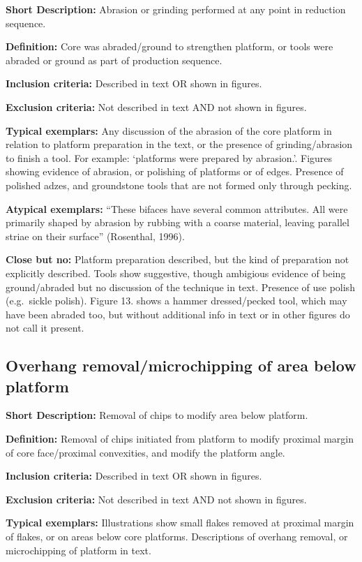 \documentclass[
]{article}
\begin{document}
\textbf{Short Description:} Abrasion or grinding performed at any point
in reduction sequence.

\textbf{Definition:} Core was abraded/ground to strengthen platform, or
tools were abraded or ground as part of production sequence.

\textbf{Inclusion criteria:} Described in text OR shown in figures.

\textbf{Exclusion criteria:} Not described in text AND not shown in
figures.

\textbf{Typical exemplars:} Any discussion of the abrasion of the core
platform in relation to platform preparation in the text, or the
presence of grinding/abrasion to finish a tool. For example: `platforms
were prepared by abrasion.'. Figures showing evidence of abrasion, or
polishing of platforms or of edges. Presence of polished adzes, and
groundstone tools that are not formed only through pecking.

\textbf{Atypical exemplars:} ``These bifaces have several common
attributes. All were primarily shaped by abrasion by rubbing with a
coarse material, leaving parallel striae on their surface'' (Rosenthal,
1996).

\textbf{Close but no:} Platform preparation described, but the kind of
preparation not explicitly described. Tools show suggestive, though
ambigious evidence of being ground/abraded but no discussion of the
technique in text. Presence of use polish (e.g.~sickle polish). Figure
13. shows a hammer dressed/pecked tool, which may have been abraded too,
but without additional info in text or in other figures do not call it
present.

\subsection{Overhang removal/microchipping of area below
platform}\label{overhang-removalmicrochipping-of-area-below-platform}

\textbf{Short Description:} Removal of chips to modify area below
platform.

\textbf{Definition:} Removal of chips initiated from platform to modify
proximal margin of core face/proximal convexities, and modify the
platform angle.

\textbf{Inclusion criteria:} Described in text OR shown in figures.

\textbf{Exclusion criteria:} Not described in text AND not shown in
figures.

\textbf{Typical exemplars:} Illustrations show small flakes removed at
proximal margin of flakes, or on areas below core platforms.
Descriptions of overhang removal, or microchipping of platform in text.
\end{document}
